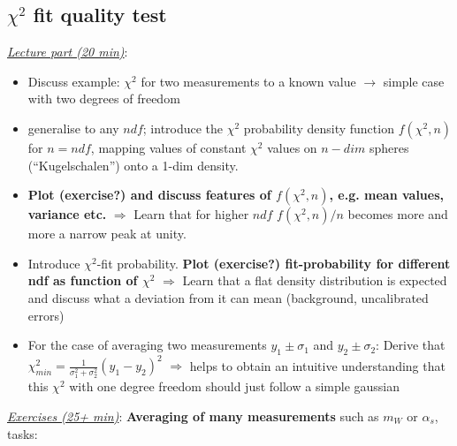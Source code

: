 \documentclass[12pt]{article}
\begin{document}
\subsection{$\chi^2$ fit quality test}
{\em \underline{Lecture part (20 min)}}:
\begin{itemize}
\item
Discuss example: $\chi^2$ for two measurements to
a known value $\rightarrow$ simple case with two degrees
of freedom
\item
generalise to any $ndf$; introduce the $\chi^2$ 
probability density function $f(\chi^2,n)$ for $n= ndf$,
mapping values of constant $\chi^2$ values on $n-dim$
spheres (``Kugelschalen'')  onto a 1-dim density. 
\item
{\bf Plot (exercise?) and discuss features of  $f(\chi^2,n)$,
e.g. mean values, variance etc.}
$\Rightarrow$ Learn that for higher $ndf$ 
$f(\chi^2,n)/n$ becomes more and more a narrow peak
at unity.
\item 
Introduce $\chi^2$-fit probability. 
{\bf Plot (exercise?) fit-probability for different ndf as function of $\chi^2$}
$\Rightarrow$ Learn that a flat density distribution is
expected and discuss what a deviation from it can mean
(background, uncalibrated errors)
\item 
For the case of averaging two measurements 
$y_1 \pm \sigma_1$ and $y_2\pm \sigma_2$: Derive that
$\chi^2_{min}= \frac{1}{\sigma_1^2+\sigma_2^2}(y_1 - y_2)^2$
$\Rightarrow$ helps to obtain an intuitive understanding that
this $\chi^2$ with one degree freedom should just follow 
a simple gaussian 
\end{itemize}
%
{\em \underline{Exercises (25+ min)}}:
{\bf Averaging of many measurements} such as {\bf 
$ m_W$} or 
{\bf $ \alpha_s$}, 
%
tasks:
\end{document}
